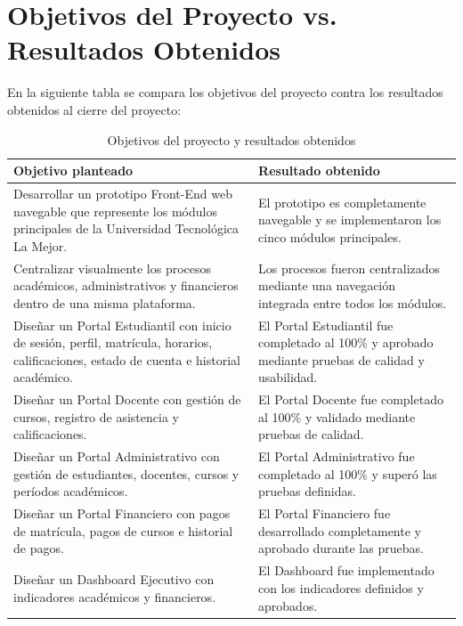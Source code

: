 \documentclass[11pt,spanish]{article}
\begin{document}
\section{Objetivos del Proyecto vs. Resultados Obtenidos}
En la siguiente tabla se compara los objetivos del proyecto contra los resultados obtenidos al cierre del proyecto:
\begin{table}[H]
\centering
\caption{Objetivos del proyecto y resultados obtenidos}
\label{tab:objetivos-resultados}
{\small
\begin{tabularx}{\textwidth}{p{6cm}Y}
\toprule
\textbf{Objetivo planteado} &
\textbf{Resultado obtenido} \\
\midrule

Desarrollar un prototipo Front-End web navegable que represente los módulos principales de la Universidad Tecnológica La Mejor.
&
El prototipo es completamente navegable y se implementaron los cinco módulos principales.
\\

Centralizar visualmente los procesos académicos, administrativos y financieros dentro de una misma plataforma.
&
Los procesos fueron centralizados mediante una navegación integrada entre todos los módulos.
\\

Diseñar un Portal Estudiantil con inicio de sesión, perfil, matrícula, horarios, calificaciones, estado de cuenta e historial académico.
&
El Portal Estudiantil fue completado al 100\% y aprobado mediante pruebas de calidad y usabilidad.
\\

Diseñar un Portal Docente con gestión de cursos, registro de asistencia y calificaciones.
&
El Portal Docente fue completado al 100\% y validado mediante pruebas de calidad.
\\

Diseñar un Portal Administrativo con gestión de estudiantes, docentes, cursos y períodos académicos.
&
El Portal Administrativo fue completado al 100\% y superó las pruebas definidas.
\\

Diseñar un Portal Financiero con pagos de matrícula, pagos de cursos e historial de pagos.
&
El Portal Financiero fue desarrollado completamente y aprobado durante las pruebas.
\\

Diseñar un Dashboard Ejecutivo con indicadores académicos y financieros.
&
El Dashboard fue implementado con los indicadores definidos y aprobados.
\\


\end{tabularx}}
\end{table}
\end{document}
